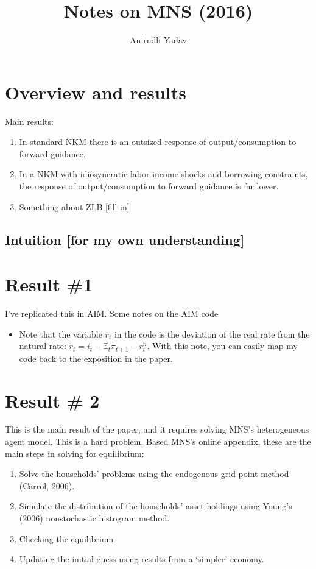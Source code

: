 \documentclass[12pt]{article}
\title{Notes on MNS (2016)}
\author{Anirudh Yadav}
\newcommand{\E}{\mathbb{E}}
\begin{document}
\maketitle



\section{Overview and results}
Main results:
\begin{enumerate}
\item In standard NKM there is an outsized response of output/consumption to forward guidance.
\item In a NKM with idiosyncratic labor income shocks and borrowing constraints, the response of output/consumption to forward guidance is far lower.
\item Something about ZLB [fill in]
\end{enumerate}

\subsection{Intuition [for my own understanding]}

\section{Result \#1}
I've replicated this in AIM. Some notes on the AIM code
\begin{itemize}
\item Note that the variable $r_t$ in the code is the deviation of the real rate from the natural rate: $\tilde r_t = i_t -\E_t\pi_{t+1} - r^n_t$. With this note, you can easily map my code back to the exposition in the paper.
\end{itemize}

\section{Result \# 2}
This is the main result of the paper, and it requires solving MNS's heterogeneous agent model. This is a hard problem. Based MNS's online appendix, these are the main steps in solving for equilibrium:

\begin{enumerate}
\item Solve the households' problems using the endogenous grid point method (Carrol, 2006).
\item Simulate the distribution of the households' asset holdings using Young's (2006) nonstochastic histogram method.
\item Checking the equilibrium
\item Updating the initial guess using results from a `simpler' economy.
\end{enumerate}
\end{document}
